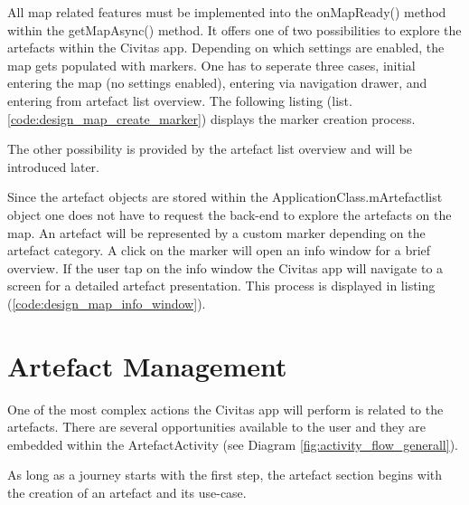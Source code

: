 All map related features must be implemented into the onMapReady() method within the getMapAsync() method. It offers one of two possibilities to explore the artefacts within the Civitas app. Depending on which settings are enabled, the map gets populated with markers. One has to seperate three cases, initial entering the map (no settings enabled), entering via navigation drawer, and entering from artefact list overview. The following listing (list. \ref{code:design_map_create_marker}) displays the marker creation process. 

\fbox{

}


The other possibility is provided by the artefact list overview and will be introduced later.

Since the artefact objects are stored within the ApplicationClass.mArtefactlist object one does not have to request the back-end to explore the artefacts on the map. 
An artefact will be represented by a custom marker depending on the artefact category. A click on the marker will open an info window for a brief overview. If the user tap on the info window the Civitas app will navigate to a screen for a detailed artefact presentation. This process is displayed in listing (\ref{code:design_map_info_window}).

\fbox{

}



\section{Artefact Management}
One of the most complex actions the Civitas app will perform is related to the artefacts. There are several opportunities available to the user and they are embedded within the ArtefactActivity (see Diagram \ref{fig:activity_flow_generall}). 

As long as a journey starts with the first step, the artefact section begins with the creation of an artefact and its use-case.


